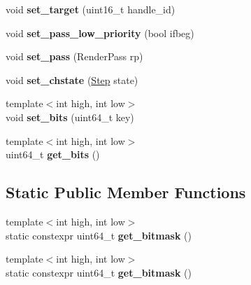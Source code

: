 \begin{DoxyCompactItemize}
void {\bfseries set\+\_\+target} (uint16\+\_\+t handle\+\_\+id)
\item 
\mbox{\label{structnabla_1_1renderer_1_1_sort_key_ab4c7a01627a9cce10597d27ee16e9f04}} 
void {\bfseries set\+\_\+pass\+\_\+low\+\_\+priority} (bool ifbeg)
\item 
\mbox{\label{structnabla_1_1renderer_1_1_sort_key_af9d1cbe98d9fda189a63ac33954989dc}} 
void {\bfseries set\+\_\+pass} (Render\+Pass rp)
\item 
\mbox{\label{structnabla_1_1renderer_1_1_sort_key_a449922d734c0a141d2085f79cf00ad4d}} 
void {\bfseries set\+\_\+chstate} (\mbox{\hyperlink{structnabla_1_1renderer_1_1_sort_key_ae0121b7c60133bb8c0bf82785307f53a}{Step}} state)
\item 
\mbox{\label{structnabla_1_1renderer_1_1_sort_key_ab28771d25172506723651981b25b3190}} 
{\footnotesize template$<$int high, int low$>$ }\\void {\bfseries set\+\_\+bits} (uint64\+\_\+t key)
\item 
\mbox{\label{structnabla_1_1renderer_1_1_sort_key_ab6e749520edd46b032d0af5cb98b1262}} 
{\footnotesize template$<$int high, int low$>$ }\\uint64\+\_\+t {\bfseries get\+\_\+bits} ()
\end{DoxyCompactItemize}
\subsection*{Static Public Member Functions}
\begin{DoxyCompactItemize}
\item 
\mbox{\label{structnabla_1_1renderer_1_1_sort_key_a9f379b6a99977f65f7a6e950bd0957f9}} 
{\footnotesize template$<$int high, int low$>$ }\\static constexpr uint64\+\_\+t {\bfseries get\+\_\+bitmask} ()
\item 
\mbox{\label{structnabla_1_1renderer_1_1_sort_key_a9f379b6a99977f65f7a6e950bd0957f9}} 
{\footnotesize template$<$int high, int low$>$ }\\static constexpr uint64\+\_\+t {\bfseries get\+\_\+bitmask} ()
\end{DoxyCompactItemize}
